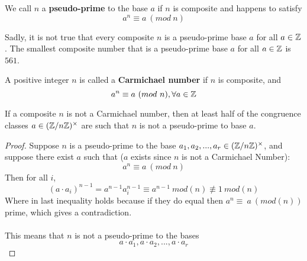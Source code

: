 \begin{definition}
We call $n$ a {\bf pseudo-prime} to the base $a$ if $n$ is composite and happens to satisfy
\[a^n \equiv a\ (mod\ n)\]
\end{definition}

\begin{remark}
Sadly, it is not true that every composite $n$ is a pseudo-prime base $a$ for all $a \in \mathbb{Z}$. The smallest composite number that is a pseudo-prime base $a$ for all $a \in \mathbb{Z}$ is $561$.
\end{remark}

\begin{definition}
A positive integer $n$ is called a {\bf Carmichael number} if $n$ is composite, and
\[a^n \equiv a\ (mod\ n), \forall a \in \mathbb{Z}\]
\end{definition}

\begin{proposition}
If a composite $n$ is not a Carmichael number, then at least half of the congruence classes $a \in (\mathbb{Z}/n\mathbb{Z})^\times$ are such that $n$ is not a pseudo-prime to base $a$.
\end{proposition}

\begin{proof}
Suppose $n$ is a pseudo-prime to the base $a_1, a_2, ..., a_r \in (\mathbb{Z}/n\mathbb{Z})^\times$, and suppose there exist $a$ such that ($a$ exists since $n$ is not a Carmichael Number):
\[a^n \equiv a\ (mod\ n)\]
Then for all $i$, 
\[(a \cdot a_i)^{n-1} = a^{n-1}a_i^{n-1} \equiv a^{n-1}\ mod(n) \nequiv 1\ mod(n)\]
Where in last inequality holds because if they do equal then $a^n \equiv\ a\ (mod(n))$prime, which gives a contradiction.\\\\
This means that $n$ is not a pseudo-prime to the bases
\[a \cdot a_1, a \cdot a_2, ..., a \cdot a_r\]
\end{proof}
